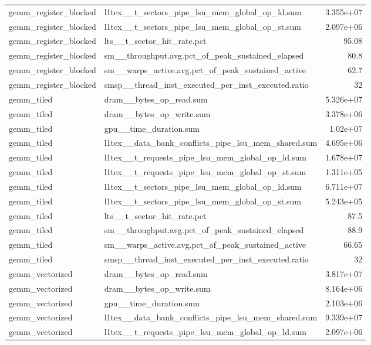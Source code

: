 \begin{longtable}{llr}
gemm\_register\_blocked & l1tex\_\_t\_sectors\_pipe\_lsu\_mem\_global\_op\_ld.sum & 3.355e+07 \\
gemm\_register\_blocked & l1tex\_\_t\_sectors\_pipe\_lsu\_mem\_global\_op\_st.sum & 2.097e+06 \\
gemm\_register\_blocked & lts\_\_t\_sector\_hit\_rate.pct & 95.08 \\
gemm\_register\_blocked & sm\_\_throughput.avg.pct\_of\_peak\_sustained\_elapsed & 80.8 \\
gemm\_register\_blocked & sm\_\_warps\_active.avg.pct\_of\_peak\_sustained\_active & 62.7 \\
gemm\_register\_blocked & smsp\_\_thread\_inst\_executed\_per\_inst\_executed.ratio & 32 \\
gemm\_tiled & dram\_\_bytes\_op\_read.sum & 5.326e+07 \\
gemm\_tiled & dram\_\_bytes\_op\_write.sum & 3.378e+06 \\
gemm\_tiled & gpu\_\_time\_duration.sum & 1.02e+07 \\
gemm\_tiled & l1tex\_\_data\_bank\_conflicts\_pipe\_lsu\_mem\_shared.sum & 4.695e+06 \\
gemm\_tiled & l1tex\_\_t\_requests\_pipe\_lsu\_mem\_global\_op\_ld.sum & 1.678e+07 \\
gemm\_tiled & l1tex\_\_t\_requests\_pipe\_lsu\_mem\_global\_op\_st.sum & 1.311e+05 \\
gemm\_tiled & l1tex\_\_t\_sectors\_pipe\_lsu\_mem\_global\_op\_ld.sum & 6.711e+07 \\
gemm\_tiled & l1tex\_\_t\_sectors\_pipe\_lsu\_mem\_global\_op\_st.sum & 5.243e+05 \\
gemm\_tiled & lts\_\_t\_sector\_hit\_rate.pct & 87.5 \\
gemm\_tiled & sm\_\_throughput.avg.pct\_of\_peak\_sustained\_elapsed & 88.9 \\
gemm\_tiled & sm\_\_warps\_active.avg.pct\_of\_peak\_sustained\_active & 66.65 \\
gemm\_tiled & smsp\_\_thread\_inst\_executed\_per\_inst\_executed.ratio & 32 \\
gemm\_vectorized & dram\_\_bytes\_op\_read.sum & 3.817e+07 \\
gemm\_vectorized & dram\_\_bytes\_op\_write.sum & 8.164e+06 \\
gemm\_vectorized & gpu\_\_time\_duration.sum & 2.103e+06 \\
gemm\_vectorized & l1tex\_\_data\_bank\_conflicts\_pipe\_lsu\_mem\_shared.sum & 9.339e+07 \\
gemm\_vectorized & l1tex\_\_t\_requests\_pipe\_lsu\_mem\_global\_op\_ld.sum & 2.097e+06 \\

\end{longtable}
